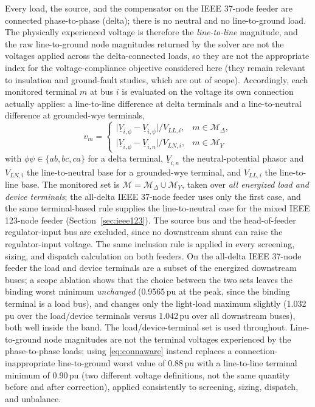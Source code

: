 \documentclass{ieeeaccess}
\newcommand{\SI}[2]{#1\,\ensuremath{\mathrm{#2}}}
\begin{document}
Every load, the source, and the compensator on the IEEE 37-node feeder are
connected phase-to-phase (delta); there is no neutral and no line-to-ground load.
The physically experienced voltage is therefore the \emph{line-to-line} magnitude,
and the raw line-to-ground node magnitudes returned by the solver are not the
voltages applied across the delta-connected loads, so they are not the appropriate
index for the voltage-compliance objective considered here (they remain relevant to
insulation and ground-fault studies, which are out of scope). Accordingly, each
monitored terminal $m$ at bus $i$ is evaluated on the voltage its own connection
actually applies: a line-to-line difference at delta terminals and a
line-to-neutral difference at grounded-wye terminals,
\begin{equation}
v_m =
\begin{cases}
\bigl|\underline V_{i,\phi}-\underline V_{i,\psi}\bigr|/V_{LL,i}, & m\in\mathcal M_\Delta,\\[2pt]
\bigl|\underline V_{i,\phi}-\underline V_{i,n}\bigr|/V_{LN,i}, & m\in\mathcal M_Y
\end{cases}
\label{eq:connaware}
\end{equation}
with $\phi\psi\in\{ab,bc,ca\}$ for a delta terminal, $\underline V_{i,n}$ the
neutral-potential phasor and $V_{LN,i}$ the line-to-neutral base for a grounded-wye
terminal, and $V_{LL,i}$ the line-to-line base. The monitored set is
$\mathcal M=\mathcal M_\Delta\cup\mathcal M_Y$, taken over \emph{all energized load and
device terminals}; the all-delta IEEE 37-node feeder uses only the first case, and
the same terminal-based rule supplies the line-to-neutral case for the mixed IEEE
123-node feeder (Section~\ref{sec:ieee123}). The source bus and the head-of-feeder regulator-input
bus are excluded, since no downstream shunt can raise the regulator-input voltage.
The same inclusion rule is applied in every screening, sizing, and dispatch
calculation on both feeders. On the all-delta IEEE 37-node feeder the load and
device terminals are a subset of the energized downstream buses; a scope ablation
shows that the choice between the two sets leaves the binding worst minimum
\emph{unchanged} (\SI{0.9565}{pu} at the peak, since the binding terminal is a load
bus), and changes only the light-load maximum slightly (\SI{1.032}{pu} over the
load/device terminals versus \SI{1.042}{pu} over all downstream buses), both well
inside the band. The load/device-terminal set is used throughout.
Line-to-ground node magnitudes are not the terminal voltages experienced by the
phase-to-phase loads; using \eqref{eq:connaware}
instead replaces a connection-inappropriate line-to-ground worst value of
\SI{0.88}{pu} with a line-to-line terminal minimum of \SI{0.90}{pu} (two different
voltage definitions, not the same quantity before and after correction), applied
consistently to screening, sizing, dispatch, and unbalance.
\end{document}
